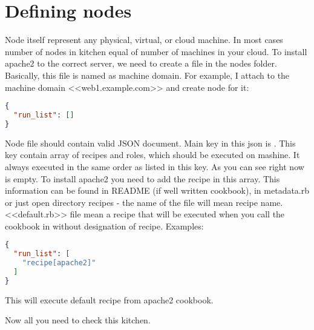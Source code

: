 \section{Defining nodes}\label{sec:solo-node}

Node itself represent any physical, virtual, or cloud machine. In most cases number of nodes in kitchen equal of number of machines in your cloud. To install apache2 to the correct server, we need to create a file in the nodes folder. Basically, this file is named as machine domain. For example, I attach to the machine domain <<web1.example.com>> and create node for it:

\begin{lstlisting}[language=JSON,label=lst:my-cloud-node1,title=my-cloud/nodes/web1.example.com.json]
{
  "run_list": []
}
\end{lstlisting}

Node file should contain valid JSON document. Main key in this json is . This key contain array of recipes and roles, which should be executed on mashine. It always executed in the same order as listed in this key. As you can see right now  is empty. To install apache2 you need to add the recipe in this array. This information can be found in README (if well written cookbook), in metadata.rb or just open directory recipes - the name of the file will mean recipe name. <<default.rb>> file mean a recipe that will be executed when you call the cookbook in  without designation of recipe. Examples:

\begin{lstlisting}[language=JSON,label=lst:my-cloud-node2,title=my-cloud/nodes/web1.example.com.json]
{
  "run_list": [
    "recipe[apache2]"
  ]
}
\end{lstlisting}

This  will execute default recipe from apache2 cookbook.

Now all you need to check this kitchen.

